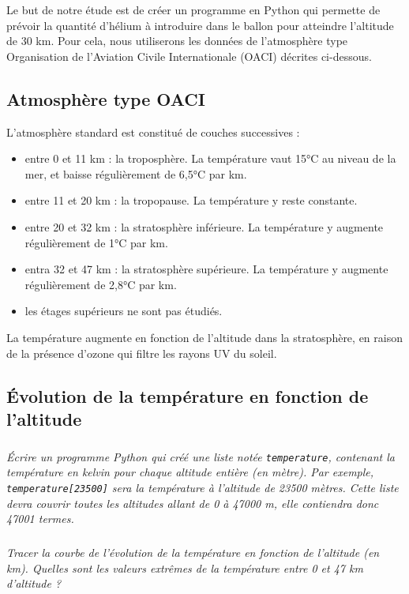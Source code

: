 \documentclass[10pt]{article}
\begin{document}
\begin{obj}

Le but de notre étude est de créer un programme en Python qui permette de prévoir la quantité d'hélium à introduire dans le ballon pour atteindre l'altitude de 30 km. Pour cela, nous utiliserons les données de l'atmosphère type Organisation de l'Aviation Civile Internationale (OACI) décrites ci-dessous.

\end{obj}

\subsection{Atmosphère type OACI}

L'atmosphère standard est constitué de couches successives :
\begin{itemize}
\item entre 0 et 11 km : la troposphère. La température vaut 15°C au niveau de la mer, et baisse régulièrement de 6,5°C par km.
\item entre 11 et 20 km : la tropopause. La température y reste constante.
\item entre 20 et 32 km : la stratosphère inférieure. La température y augmente régulièrement de 1°C par km.
\item entra 32 et 47 km : la stratosphère supérieure. La température y augmente régulièrement de 2,8°C par km.
\item les étages supérieurs ne sont pas étudiés.
\end{itemize}

\begin{rem}
La température augmente en fonction de l'altitude dans la stratosphère, en raison de la présence d'ozone qui filtre les rayons UV du soleil.
\end{rem}

\subsection{\'Evolution de la température en fonction de l'altitude}
\subparagraph{}
\textit{Écrire un programme Python qui créé une liste notée \texttt{temperature}, contenant la température en kelvin pour chaque altitude entière (en mètre). Par exemple, \texttt{temperature[23500]} sera la température à l'altitude de 23500 mètres. Cette liste devra couvrir toutes les altitudes allant de 0 à 47000 m, elle contiendra donc 47001 termes.}

\subparagraph{}
\textit{Tracer la courbe de l'évolution de la température en fonction de l'altitude (en km). Quelles sont les valeurs extrêmes de la température entre 0 et 47 km d'altitude ?}
\end{document}

